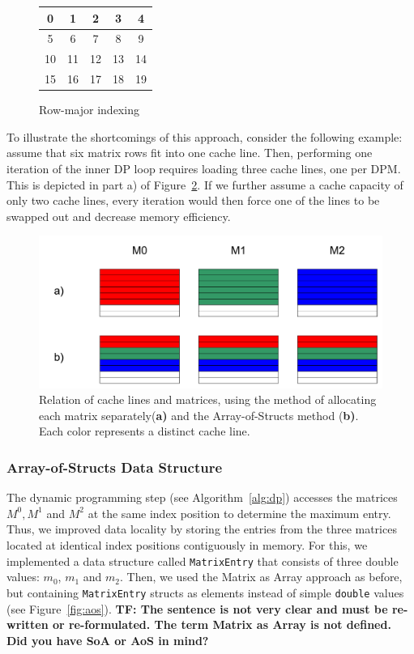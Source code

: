 \documentclass[runningheads,a4paper]{llncs}
\begin{document}
\begin{figure}
\begin{minipage}{0.7\textwidth}
\centering
\begin{tabular}{|c|c|c|c|c|}
\hline
0 & 1 & 2 & 3 & 4 \\
\hline
5 & 6 & 7 & 8 & 9 \\
\hline
10 & 11 & 12 & 13 & 14 \\
\hline
15 & 16 & 17 & 18 & 19 \\
\hline
\end{tabular}
\caption{Row-major indexing}
\label{fig:rowmajor}
\end{minipage}
\end{figure}

To illustrate the shortcomings of this approach, consider the following example: assume that six matrix rows fit into one cache line.
Then, performing one iteration of the inner DP loop requires loading three cache lines, one per DPM.
This is depicted in part a) of Figure~\ref{fig:cachelines}.
If we further assume a cache capacity of only two cache lines,
every iteration would then force one of the lines to be swapped out and decrease memory efficiency.

\begin{figure}
\centering
\includegraphics[width=\textwidth]{images/cachelines.pdf}
\caption{Relation of cache lines and matrices, using the method of allocating each matrix separately(\textbf{a)} and the Array-of-Structs method (\textbf{b)}.
Each color represents a distinct cache line.}
\label{fig:cachelines}
\end{figure}

\subsubsection{Array-of-Structs Data Structure}
The dynamic programming step (see Algorithm~\ref{alg:dp}) accesses the matrices $M^0, M^1$ and $M^2$ at the same index position to determine the maximum entry.
Thus, we improved data locality by storing the entries from the three matrices located at identical index positions contiguously in memory.
For this, we implemented a data structure called \texttt{MatrixEntry} that consists of three double values: \texttt{$m_0$}, \texttt{$m_1$} and \texttt{$m_2$}.
Then, we used the Matrix as Array approach as before, but containing \texttt{MatrixEntry} structs as elements instead of simple
\texttt{double} values (see Figure~\ref{fig:aos}). 
\textbf{TF: The sentence is not very clear and must be re-written or re-formulated. 
The term Matrix as Array is not defined. Did you have SoA or AoS in mind?}
\end{document}
